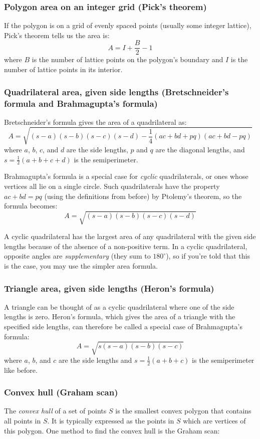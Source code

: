 \documentclass[a4paper,12pt]{article}
\begin{document}
\subsubsection{Polygon area on an integer grid (Pick's theorem)}
\noindent If the polygon is on a grid of evenly spaced points (usually some integer lattice), Pick's theorem tells us the area is:
\[A=I+\frac{B}{2}-1\]
where $B$ is the number of lattice points on the polygon's boundary and $I$ is the number of lattice points in its interior.

\subsubsection{Quadrilateral area, given side lengths (Bretschneider's formula and Brahmagupta's formula)}
Bretschneider's formula gives the area of a quadrilateral as:
\[A=\sqrt{(s-a)(s-b)(s-c)(s-d)-\frac{1}{4}(ac+bd+pq)(ac+bd-pq)}\]
\noindent where $a$, $b$, $c$, and $d$ are the side lengths, $p$ and $q$ are the diagonal lengths, and $s=\frac{1}{2}\left(a+b+c+d\right)$ is the semiperimeter.

Brahmagupta's formula is a special case for {\em cyclic} quadrilaterals, or ones whose vertices all lie on a single circle. Such quadrilaterals have the property $ac+bd=pq$ (using the definitions from before) by Ptolemy's theorem, so the formula becomes:
\[A=\sqrt{(s-a)(s-b)(s-c)(s-d)}\]

A cyclic quadrilateral has the largest area of any quadrilateral with the given side lengths because of the absence of a non-positive term. In a cyclic quadrilateral, opposite angles are {\em  supplementary} (they sum to $180^{\circ}$), so if you're told that this is the case, you may use the simpler area formula.

\subsubsection{Triangle area, given side lengths (Heron's formula)}
A triangle can be thought of as a cyclic quadrilateral where one of the side lengths is zero. Heron's formula, which gives the area of a triangle with the specified side lengths, can therefore be called a special case of Brahmagupta's formula:
\[A=\sqrt{s(s-a)(s-b)(s-c)}\]
\noindent where $a$, $b$, and $c$ are the side lengths and $s=\frac{1}{2}\left(a+b+c\right)$ is the semiperimeter like before.

\subsubsection{Convex hull (Graham scan)}
The {\em convex hull} of a set of points $S$ is the smallest convex polygon that contains all points in $S$. It is typically expressed as the points in $S$ which are vertices of this polygon. One method to find the convex hull is the Graham scan:
\end{document}
